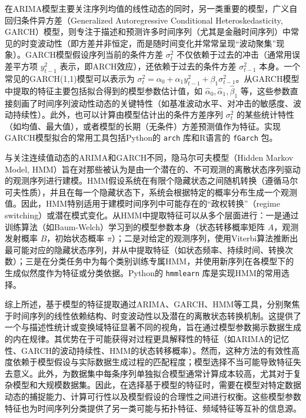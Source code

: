 在ARIMA模型主要关注序列均值的线性动态的同时，另一类重要的模型，广义自回归条件异方差（Generalized Autoregressive Conditional Heteroskedasticity, GARCH）模型，则专注于描述和预测许多时间序列（尤其是金融时间序列）中常见的时变波动性（即方差并非恒定，而是随时间变化并常常呈现“波动聚集”现象）。GARCH模型假设序列当前的条件方差 $\sigma_t^2$ 不仅依赖于过去的冲击（通常用误差平方项 $y_{t-1}^2$ 表示，即ARCH效应），还依赖于过去的条件方差 $\sigma_{t-1}^2$ 本身。一个常见的GARCH(1,1)模型可以表示为 $\sigma_t^2 = \alpha_0 + \alpha_1 y_{t-1}^2 + \beta_1 \sigma_{t-1}^2$。从GARCH模型中提取的特征主要包括拟合得到的模型参数估计值，如 $\hat{\alpha}_0, \hat{\alpha}_1, \hat{\beta}_1$ 等，这些参数直接刻画了时间序列波动性动态的关键特性（如基准波动水平、对冲击的敏感度、波动持续性）。此外，也可以计算由模型估计出的条件方差序列 $\sigma_t^2$ 的某些统计特性（如均值、最大值），或者模型的长期（无条件）方差预测值作为特征。实现GARCH模型拟合的常用工具包括Python的 \texttt{arch} 库和R语言的 \texttt{fGarch} 包。

与关注连续值动态的ARIMA和GARCH不同，隐马尔可夫模型（Hidden Markov Model, HMM）旨在对那些被认为是由一个潜在的、不可观测的离散状态序列驱动的观测序列进行建模。HMM假设系统在有限个隐藏状态之间随机转换（遵循马尔可夫性质），并且在每一个隐藏状态下，系统会根据特定的概率分布生成一个观测值。因此，HMM特别适用于建模时间序列中可能存在的“政权转换”（regime switching）或潜在模式变化。从HMM中提取特征可以从多个层面进行：一是通过训练算法（如Baum-Welch）学习到的模型参数本身（状态转移概率矩阵 $A$，观测发射概率 $B$，初始状态概率 $\pi$）；二是对给定的观测序列，使用Viterbi算法推断出最可能对应的隐藏状态序列，并从中提取特征（如状态频率、持续时间、转换次数）；三是在分类任务中为每个类别训练专属HMM，并使用新序列在各模型下的生成似然度作为特征或分类依据。Python的 \texttt{hmmlearn} 库是实现HMM的常用选择。

综上所述，基于模型的特征提取通过ARIMA、GARCH、HMM等工具，分别聚焦于时间序列的线性依赖结构、时变波动性以及潜在的离散状态转换机制。这提供了一个与描述性统计或变换域特征显著不同的视角，旨在通过模型参数揭示数据生成的内在规律。其优势在于可能获得对过程更具解释性的特征（如ARIMA的记忆性、GARCH的波动持续性、HMM的状态转移概率）。然而，这种方法的有效性高度依赖于模型假设与实际数据生成过程的匹配程度；模型选择不当可能导致特征失去意义。此外，为数据集中每条序列单独拟合模型通常计算成本较高，尤其对于复杂模型和大规模数据集。因此，在选择基于模型的特征时，需要在模型对特定数据动态的捕捉能力、计算可行性以及模型假设的合理性之间进行权衡。这些模型参数特征也为时间序列分类提供了另一类可能与拓扑特征、频域特征等互补的信息源。

            
